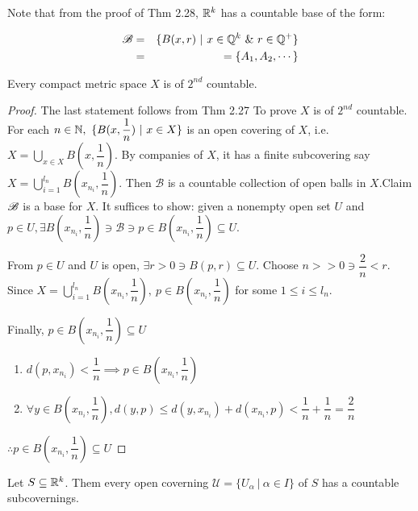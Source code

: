 Note that from the proof of Thm 2.28, $\mathbb{R}^k$ has a countable base of the form:

\begin{eqnarray*}
	\mathscr{B} &=& \{B(x,r)~|~x \in  \mathbb{Q}^k ~\&~ r \in \mathbb{Q}^+ \}\\
	&=& = \{A_1,A_2,\cdots\}
\end{eqnarray*}

\begin{thm}
	Every compact metric space $X$ is of $2^{nd}$ countable.
\end{thm}

\begin{proof}
	The last statement follows from Thm 2.27 To prove $X$ is of $2^{nd}$ countable. For each $n \in \mathbb{N},~\{B(x,\dfrac{1}{n})~|~x \in X\}$ is an open covering of $X$, i.e. $X = \bigcup_{x \in X}B(x,\dfrac{1}{n})$. By companies of $X$, it has a finite subcovering say $X = \bigcup_{i=1}^{l_n}B(x_{n_i},\dfrac{1}{n})$. Then $\mathscr B$ is a countable collection of open balls in $X$.Claim $\mathscr{B}$ is a base for $X$. It suffices to show: given a nonempty open set $U$ and $p \in　U,\exists B(x_{n_i},\dfrac{1}{n}) \ni \mathscr B \ni p \in B(x_{n_i},\dfrac{1}{n}) \subseteq U$.
	
	From $p \in U$ and $U$ is open, $\exists r > 0 \ni B(p,r)\subseteq U$. Choose $n >> 0 \ni \dfrac{2}{n} < r$. Since $X = \bigcup^{l_n}_{i=1}B(x_{n_i},\dfrac{1}{n}),~ p \in B(x_{n_i},\dfrac{1}{n})$ for some $1 \leq i \leq l_n$.
	
	Finally, $p \in B(x_{n_i},\dfrac{1}{n}) \subseteq U$
	
	\begin{enumerate}[label = $\bullet$]
		\item $d(p,x_{n_i}) < \dfrac{1}{n} \implies p \in B(x_{n_i},\dfrac{1}{n})$
		\item $\forall y \in B(x_{n_i},\dfrac{1}{n}),d(y,p) \leq d(y,x_{n_i}) + d(x_{n_i},p) < \dfrac{1}{n} + \dfrac{1}{n} = \dfrac{2}{n}$
	\end{enumerate}
	
	$\therefore p \in B(x_{n_i},\dfrac{1}{n}) \subseteq U$
\end{proof}

\begin{thm}
	Let $S \subseteq \mathbb{R}^k$. Them every open coverning $\mathscr U = \{U_\alpha ~|~ \alpha \in I\}$ of $S$ has a countable subcovernings. 
\end{thm}

\newpage

